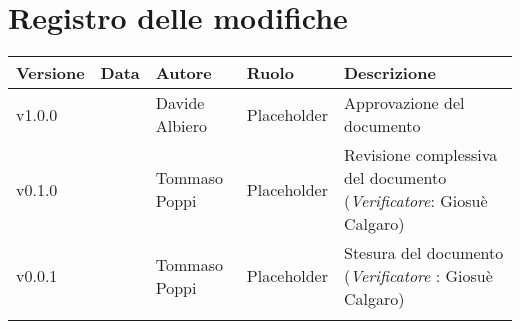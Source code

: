 \section*{\hfil Registro delle modifiche \hfil}
{
	\newlength{\freewidth}
	\setlength{\freewidth}{\dimexpr\textwidth-10\tabcolsep}
	\renewcommand{\arraystretch}{1.5}
	\centering
	\setlength{\aboverulesep}{0pt}
	\setlength{\belowrulesep}{0pt}
	\begin{longtable}{C{.131777\freewidth} C{.134036\freewidth} C{.263554\freewidth} C{.188254\freewidth} C{.282379\freewidth}}
		\toprule 
		\textbf{Versione} & \textbf{Data} & \textbf{Autore} & \textbf{Ruolo} & \textbf{Descrizione}\\
		\toprule
		\endhead
		
		v1.0.0 & \DataDoc{} &Davide Albiero & Placeholder & Approvazione del documento \\  
		v0.1.0 & \DataDoc{} & Tommaso Poppi & Placeholder & Revisione complessiva del documento (\textit{Verificatore}: Giosuè Calgaro) \\ 
		v0.0.1 & \DataDoc{} & Tommaso Poppi & Placeholder & Stesura del documento (\textit{Verificatore} : Giosuè Calgaro) \\
		
		
		\bottomrule
		\hiderowcolors
	\end{longtable}
}
